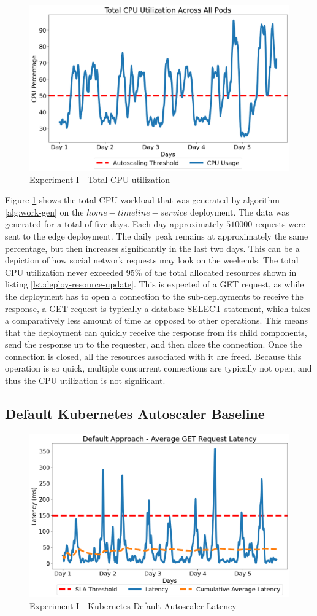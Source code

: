 \begin{figure}[htb]
    \centering
    \caption{Experiment I - Total CPU utilization}
    \label{fig:exp1-workload}
    \includegraphics[width=0.6\linewidth]{Figures/GET-Total-CPU.png}
\end{figure}

Figure \ref{fig:exp1-workload} shows the total CPU workload that was generated by algorithm \ref{alg:work-gen} on the $home-timeline-service$ deployment. The data was generated for a total of five days. Each day approximately $510000$ requests were sent to the edge deployment. The daily peak remains at approximately the same percentage, but then increases significantly in the last two days. This can be a depiction of how social network requests may look on the weekends. The total CPU utilization never exceeded 95\% of the total allocated resources shown in listing \ref{lst:deploy-resource-update}. This is expected of a GET request, as while the deployment has to open a connection to the sub-deployments to receive the response, a GET request is typically a database SELECT statement, which takes a comparatively less amount of time as opposed to other operations. This means that the deployment can quickly receive the response from its child components, send the response up to the requester, and then close the connection. Once the connection is closed, all the resources associated with it are freed. Because this operation is so quick, multiple concurrent connections are typically not open, and thus the CPU utilization is not significant.\par

\subsection {Default Kubernetes Autoscaler Baseline}
\label{subsec:ch5-exp1-default-algo}

\begin{figure}[htb]
    \centering
    \caption{Experiment I - Kubernetes Default Autoscaler Latency}
    \label{fig:exp1-default-k8s}
    \includegraphics[width=0.6\linewidth]{Figures/Home-Timeline-Default-Latency.png}
\end{figure}


